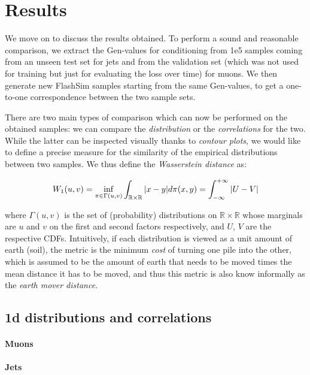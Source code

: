 \section{Results}

We move on to discuss the results obtained. 
To perform a sound and reasonable comparison, we extract the Gen-values for conditioning from 1e5 samples coming from an unseen test set for jets and from the validation set (which was not used for training but just for evaluating the loss over time) for muons. We then generate new FlashSim samples starting from the same Gen-values, to get a one-to-one correspondence between the two sample sets.

There are two main types of comparison which can now be performed on the obtained samples: we can compare the \emph{distribution} or the \emph{correlations} for the two.
While the latter can be inspected visually thanks to \emph{contour plots}, we would like to define a precise measure for the similarity of the empirical distributions between two samples. We thus define the \emph{Wasserstein distance} as:

\[W_1(u, v) = \inf_{\pi \in \Gamma(u, v)}\int_{\mathbb{R}\times\mathbb{R}}\abs{x-y}d\pi(x,y) = \int_{-\infty}^{+\infty} \abs{U - V}\]

where $\Gamma(u, v)$ is the set of (probability) distributions on $\mathbb{R}\times\mathbb{R}$ whose marginals are $u$ and $v$ on the first and second factors respectively, and $U$, $V$ are the respective CDFs. Intuitively, if each distribution is viewed as a unit amount of earth (soil), the metric is the minimum \emph{cost} of turning one pile into the other, which is assumed to be the amount of earth that needs to be moved times the mean distance it has to be moved, and thus this metric is also know informally as the \emph{earth mover distance}.

\subsection{1d distributions and correlations}

\paragraph{Muons}



\paragraph{Jets}

